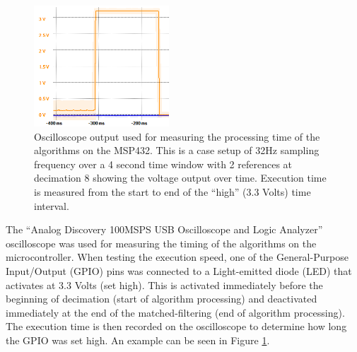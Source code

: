 \documentclass[journal]{IEEEtran}
\begin{document}
\begin{figure}[!ht]
   \centering
   \includegraphics[width=0.45\textwidth]{32Hz_4sec_8downsample_2Reference_Pulse.PNG}
   \caption{Oscilloscope output used for measuring the processing time of the algorithms on the MSP432. This is a case setup of 32Hz sampling frequency over a 4 second time window with 2 references at decimation 8 showing the voltage output over time. Execution time is measured from the start to end of the ``high'' (3.3 Volts) time interval.}
   \label{fig:time_measure}
\end{figure}
%
The ``Analog Discovery 100MSPS USB Oscilloscope and Logic Analyzer'' oscilloscope was used for measuring the timing of the algorithms on the microcontroller.
When testing the execution speed, one of the General-Purpose Input/Output (GPIO) pins was connected to a Light-emitted diode (LED) that activates at 3.3 Volts (set high).
This is activated immediately before the beginning of decimation (start of algorithm processing) and deactivated immediately at the end of the matched-filtering (end of algorithm processing).
The execution time is then recorded on the oscilloscope to determine how long the GPIO was set high.
An example can be seen in Figure \ref{fig:time_measure}.
\end{document}
